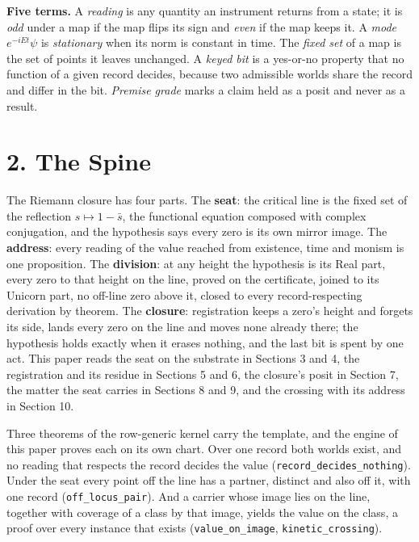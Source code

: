 \documentclass[10pt]{article}
\begin{document}
\textbf{Five terms.} A \emph{reading} is any quantity an instrument
returns from a state; it is \emph{odd} under a map if the map flips its
sign and \emph{even} if the map keeps it. A \emph{mode} \(e^{-iEt}\psi\)
is \emph{stationary} when its norm is constant in time. The \emph{fixed
set} of a map is the set of points it leaves unchanged. A \emph{keyed
bit} is a yes-or-no property that no function of a given record decides,
because two admissible worlds share the record and differ in the bit.
\emph{Premise grade} marks a claim held as a posit and never as a
result.

\hypertarget{the-spine}{%
\section{2. The Spine}\label{the-spine}}

The Riemann closure has four parts. The \textbf{seat}: the critical line
is the fixed set of the reflection \(s\mapsto 1-\bar s\), the functional
equation composed with complex conjugation, and the hypothesis says
every zero is its own mirror image. The \textbf{address}: every reading
of the value reached from existence, time and monism is one proposition.
The \textbf{division}: at any height the hypothesis is its Real part,
every zero to that height on the line, proved on the certificate, joined
to its Unicorn part, no off-line zero above it, closed to every
record-respecting derivation by theorem. The \textbf{closure}:
registration keeps a zero's height and forgets its side, lands every
zero on the line and moves none already there; the hypothesis holds
exactly when it erases nothing, and the last bit is spent by one act.
This paper reads the seat on the substrate in Sections 3 and 4, the
registration and its residue in Sections 5 and 6, the closure's posit in
Section 7, the matter the seat carries in Sections 8 and 9, and the
crossing with its address in Section 10.

Three theorems of the row-generic kernel carry the template, and the
engine of this paper proves each on its own chart. Over one record both
worlds exist, and no reading that respects the record decides the value
(\texttt{record\_decides\_nothing}). Under the seat every point off the
line has a partner, distinct and also off it, with one record
(\texttt{off\_locus\_pair}). And a carrier whose image lies on the line,
together with coverage of a class by that image, yields the value on the
class, a proof over every instance that exists
(\texttt{value\_on\_image}, \texttt{kinetic\_crossing}).
\end{document}
